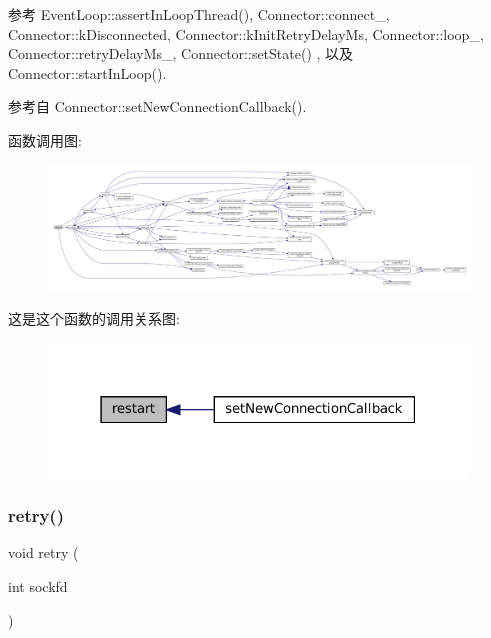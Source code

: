 参考 Event\+Loop\+::assert\+In\+Loop\+Thread(), Connector\+::connect\+\_\+, Connector\+::k\+Disconnected, Connector\+::k\+Init\+Retry\+Delay\+Ms, Connector\+::loop\+\_\+, Connector\+::retry\+Delay\+Ms\+\_\+, Connector\+::set\+State() , 以及 Connector\+::start\+In\+Loop().



参考自 Connector\+::set\+New\+Connection\+Callback().

函数调用图\+:
\nopagebreak
\begin{figure}[H]
\begin{center}
\leavevmode
\includegraphics[width=350pt]{classmuduo_1_1Connector_a22ee094ca3f45aa4156b97d34fe678bf_cgraph}
\end{center}
\end{figure}
这是这个函数的调用关系图\+:
\nopagebreak
\begin{figure}[H]
\begin{center}
\leavevmode
\includegraphics[width=315pt]{classmuduo_1_1Connector_a22ee094ca3f45aa4156b97d34fe678bf_icgraph}
\end{center}
\end{figure}
\mbox{\label{classmuduo_1_1Connector_a6a23d487c31355d8663ccdd4cbf4f499}} 
\subsubsection{\texorpdfstring{retry()}{retry()}}
{\footnotesize\ttfamily void retry (\begin{DoxyParamCaption}\item[{int}]{sockfd }\end{DoxyParamCaption})\hspace{0.3cm}{\ttfamily [private]}}



